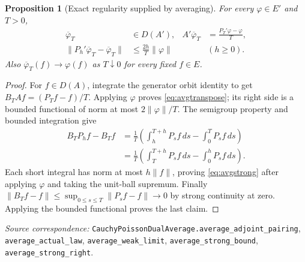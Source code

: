 \documentclass[11pt]{article}
\newtheorem{proposition}[theorem]{Proposition}
\newcommand{\code}[1]{{\small\nolinkurl{#1}}}
\begin{document}
\begin{proposition}[Exact regularity supplied by averaging]\label{prop:dualavg}
For every $\varphi\in E'$ and $T>0$,
\begin{align}
 \overline\varphi_T&\in D(A'),&
 A'\overline\varphi_T&=\frac{P_T'\varphi-\varphi}{T},\label{eq:avgtranspose}\\
 \|P_h'\overline\varphi_T-\overline\varphi_T\|
       &\leq\frac{2h}{T}\|\varphi\|&& (h\geq0).\label{eq:avgstrong}
\end{align}
Also $\overline\varphi_T(f)\to\varphi(f)$ as $T\downarrow0$ for
every fixed $f\in E$.
\end{proposition}
\begin{proof}
For $f\in D(A)$, integrate the generator orbit identity to get
$B_TAf=(P_Tf-f)/T$. Applying $\varphi$ proves
\eqref{eq:avgtranspose}; its right side is a bounded functional of
norm at most $2\|\varphi\|/T$.
The semigroup property and bounded integration give
\begin{align*}
 B_TP_hf-B_Tf
 &=\frac1T\left(\int_h^{T+h}P_sf\,ds-\int_0^TP_sf\,ds\right)\\
 &=\frac1T\left(\int_T^{T+h}P_sf\,ds-\int_0^hP_sf\,ds\right).
\end{align*}
Each short integral has norm at most $h\|f\|$, proving
\eqref{eq:avgstrong} after applying $\varphi$ and taking the unit-ball
supremum. Finally
$\|B_Tf-f\|\leq\sup_{0\leq s\leq T}\|P_sf-f\|\to0$ by strong
continuity at zero. Applying the bounded functional proves the last claim.
\end{proof}
\par\smallskip\begingroup\small\raggedright
\textit{Source correspondence:} \code{CauchyPoissonDualAverage.average_adjoint_pairing},
\code{average_actual_law}, \code{average_weak_limit},
\code{average_strong_bound}, \code{average_strong_right}.
\par\endgroup
\end{document}
